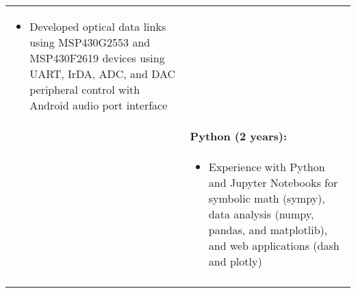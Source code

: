 \begin{tabular}{L{\hlcolw}  L{\rcolw}}
\begin{itemize}[leftmargin = \itemmargin]
		\item Developed optical data links using MSP430G2553 and MSP430F2619 devices using UART, IrDA, ADC, and DAC peripheral control with Android audio port interface
	\end{itemize} \\
	
	& \textbf{Python (2 years):} \\
	&
	\vspace{-0.3in}
	\begin{itemize}[leftmargin = \itemmargin]
		\item Experience with Python and Jupyter Notebooks for symbolic math (sympy), data analysis (numpy, pandas, and matplotlib), and web applications (dash and plotly)
	\end{itemize}
	
	\\
	
	\hline \\
\end{tabular}